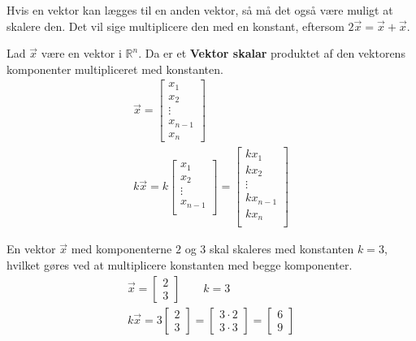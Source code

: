 Hvis en vektor kan lægges til en anden vektor, så må det også være muligt at skalere den. Det vil sige multiplicere den med en konstant, eftersom $2\vec{x}=\vec{x}+\vec{x}$.\\  %

\begin{defn}
Lad $\vec{x}$ være en vektor i $\mathds{R}^n$. Da er et \textbf{Vektor skalar} produktet af den vektorens komponenter multipliceret med konstanten.
\begin{align*}
\vec{x}=\begin{bmatrix}
x_1\\
x_2\\
\vdots\\
x_{n-1}\\
x_n
\end{bmatrix}\\
k\vec{x}=k\begin{bmatrix}
x_1\\
x_2\\
\vdots\\
x_{n-1}\\
\end{bmatrix}=
\begin{bmatrix}
kx_1\\
kx_2\\
\vdots\\
kx_{n-1}\\
kx_n\\
\end{bmatrix}
\end{align*}
\end{defn}
\begin{eks}
En vektor $\vec{x}$ med komponenterne $2$ og $3$ skal skaleres med konstanten $k=3$, hvilket gøres ved at multiplicere konstanten med begge komponenter.
\begin{align*}
\vec{x}=\begin{bmatrix}
2\\
3
\end{bmatrix}\qquad k=3\\
k\vec{x}=3
\begin{bmatrix}
2\\
3
\end{bmatrix}
=
\begin{bmatrix}
3\cdot2\\
3\cdot3
\end{bmatrix}
=
\begin{bmatrix}
6\\
9
\end{bmatrix}
\end{align*}
\end{eks}
